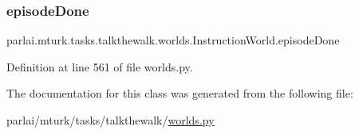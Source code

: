 \subsubsection{\texorpdfstring{episode\+Done}{episodeDone}}
{\footnotesize\ttfamily parlai.\+mturk.\+tasks.\+talkthewalk.\+worlds.\+Instruction\+World.\+episode\+Done}



Definition at line 561 of file worlds.\+py.



The documentation for this class was generated from the following file\+:\begin{DoxyCompactItemize}
\item 
parlai/mturk/tasks/talkthewalk/\hyperlink{parlai_2mturk_2tasks_2talkthewalk_2worlds_8py}{worlds.\+py}\end{DoxyCompactItemize}
